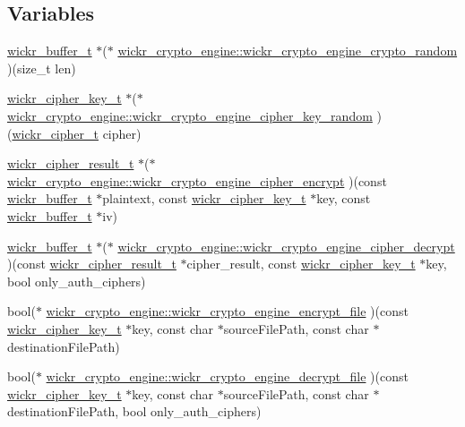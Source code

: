 \subsection*{Variables}
\begin{DoxyCompactItemize}
\item 
\hyperlink{structwickr__buffer}{wickr\+\_\+buffer\+\_\+t} $\ast$($\ast$ \hyperlink{group__wickr__crypto__engine_gae12855853c05caa473e748a62611d307}{wickr\+\_\+crypto\+\_\+engine\+::wickr\+\_\+crypto\+\_\+engine\+\_\+crypto\+\_\+random} )(size\+\_\+t len)
\item 
\hyperlink{structwickr__cipher__key}{wickr\+\_\+cipher\+\_\+key\+\_\+t} $\ast$($\ast$ \hyperlink{group__wickr__crypto__engine_gabc120effc5248a491b18138f9b74b526}{wickr\+\_\+crypto\+\_\+engine\+::wickr\+\_\+crypto\+\_\+engine\+\_\+cipher\+\_\+key\+\_\+random} )(\hyperlink{structwickr__cipher}{wickr\+\_\+cipher\+\_\+t} cipher)
\item 
\hyperlink{structwickr__cipher__result}{wickr\+\_\+cipher\+\_\+result\+\_\+t} $\ast$($\ast$ \hyperlink{group__wickr__crypto__engine_ga5aacf927a96a30aa63f3fc1bce262caf}{wickr\+\_\+crypto\+\_\+engine\+::wickr\+\_\+crypto\+\_\+engine\+\_\+cipher\+\_\+encrypt} )(const \hyperlink{structwickr__buffer}{wickr\+\_\+buffer\+\_\+t} $\ast$plaintext, const \hyperlink{structwickr__cipher__key}{wickr\+\_\+cipher\+\_\+key\+\_\+t} $\ast$key, const \hyperlink{structwickr__buffer}{wickr\+\_\+buffer\+\_\+t} $\ast$iv)
\item 
\hyperlink{structwickr__buffer}{wickr\+\_\+buffer\+\_\+t} $\ast$($\ast$ \hyperlink{group__wickr__crypto__engine_ga81cff182bb87f963996b75891e242ed4}{wickr\+\_\+crypto\+\_\+engine\+::wickr\+\_\+crypto\+\_\+engine\+\_\+cipher\+\_\+decrypt} )(const \hyperlink{structwickr__cipher__result}{wickr\+\_\+cipher\+\_\+result\+\_\+t} $\ast$cipher\+\_\+result, const \hyperlink{structwickr__cipher__key}{wickr\+\_\+cipher\+\_\+key\+\_\+t} $\ast$key, bool only\+\_\+auth\+\_\+ciphers)
\item 
bool($\ast$ \hyperlink{group__wickr__crypto__engine_gaa77b1bc373d92d9db9d801bcc4a4d29c}{wickr\+\_\+crypto\+\_\+engine\+::wickr\+\_\+crypto\+\_\+engine\+\_\+encrypt\+\_\+file} )(const \hyperlink{structwickr__cipher__key}{wickr\+\_\+cipher\+\_\+key\+\_\+t} $\ast$key, const char $\ast$source\+File\+Path, const char $\ast$destination\+File\+Path)
\item 
bool($\ast$ \hyperlink{group__wickr__crypto__engine_ga361b843efc839e30f90ce24c15b1dd27}{wickr\+\_\+crypto\+\_\+engine\+::wickr\+\_\+crypto\+\_\+engine\+\_\+decrypt\+\_\+file} )(const \hyperlink{structwickr__cipher__key}{wickr\+\_\+cipher\+\_\+key\+\_\+t} $\ast$key, const char $\ast$source\+File\+Path, const char $\ast$destination\+File\+Path, bool only\+\_\+auth\+\_\+ciphers)

\end{DoxyCompactItemize}
